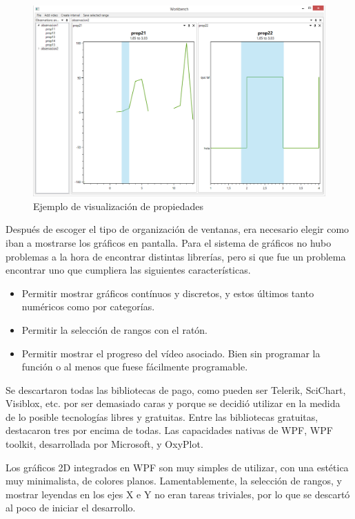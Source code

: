 \begin{figure}[h]
	\centering
	\includegraphics[width=0.9\linewidth]{./Figures/Capturas/SeleccionRango.PNG}
	\caption{Ejemplo de visualizaci\'on de propiedades}
	\label{fig:EjemploObservacion}
\end{figure}

Despu\'es de escoger el tipo de organizaci\'on de ventanas, era necesario elegir como iban a mostrarse los gr\'aficos en pantalla.
Para el sistema de gr\'aficos no hubo problemas a la hora de encontrar distintas librer\'ias, pero si que fue un 
problema encontrar uno que cumpliera las siguientes caracter\'isticas.

\begin{itemize}
	\item Permitir mostrar gr\'{a}ficos cont\'{i}nuos y discretos, y estos \'{u}ltimos tanto num\'{e}ricos como por categor\'{i}as.
	\item Permitir la selecci\'{o}n de rangos con el rat\'{o}n.
	\item Permitir mostrar el progreso del v\'{i}deo asociado. Bien sin programar la funci\'{o}n o al menos que fuese f\'{a}cilmente programable.
\end{itemize}

Se descartaron todas las bibliotecas de pago, como pueden ser Telerik, SciChart, Visiblox, etc. por ser demasiado caras
y porque se decidi\'o utilizar en la medida de lo posible tecnolog\'ias libres y gratuitas. Entre las bibliotecas
gratuitas, destacaron tres por encima de todas. Las capacidades nativas de WPF,
WPF toolkit, desarrollada por Microsoft, y OxyPlot.

Los gr\'aficos 2D integrados en WPF son muy simples de utilizar, con una est\'etica muy minimalista, de colores planos.
Lamentablemente, la selecci\'on de rangos, y mostrar leyendas en los ejes X e Y no eran tareas triviales, por lo que
se descart\'o al poco de iniciar el desarrollo.

